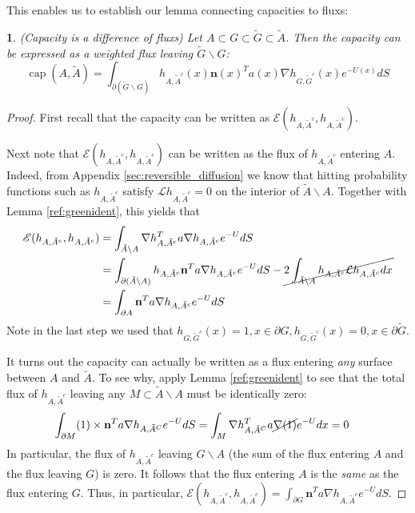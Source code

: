 \documentclass[english, aip, jcp, priprint, graphicx,floatfix]{revtex4-1}
\theoremstyle{plain}
\newtheorem*{lem*}{\protect\lemmaname}
\theoremstyle{definition}
\theoremstyle{plain}
\providecommand{\lemmaname}{Lemma}
\begin{document}
This enables us to establish our lemma connecting capacities to fluxs:

\begin{lem*}(Capacity is a difference of fluxs)  Let $A\subset G \subset \tilde G \subset \tilde A$.  Then the capacity can be expressed as a weighted flux leaving $\tilde G \backslash G$:
\[
\ensuremath{\operatorname{cap}} (A, \tilde{A}) = \int_{\partial (\tilde G \backslash G)}  h_{A, \tilde{A}^c} (x)   \textbf{n}(x)^T a (x) \nabla h_{G, \tilde{G}^c} (x)e^{- U (x)} dS
\]
\end{lem*}
\begin{proof}
First recall that the capacity can be written as $\mathscr{E}(h_{A,\tilde A^c},h_{A,\tilde A^c})$.

Next note that $\mathscr{E}(h_{A,\tilde A^c},h_{A,\tilde A^c}) $ can be written as the flux of $h_{A,\tilde A^c}$ entering $A$.  Indeed, from Appendix \ref{sec:reversible_diffusion} we know that hitting probability functions such as $h_{A,\tilde A^c}$ satisfy $\mathcal Lh_{A,\tilde A^c}=0$ on the interior of $\tilde A \backslash A$.  Together with Lemma \ref{ref:greenident}, this yields that 
\begin{align*}
\mathscr{E}(h_{A,\tilde A^c},h_{A,\tilde A^c}) 
    &= \int_{\tilde A \backslash A}  \nabla h_{A, \tilde{A}^c}^T a  \nabla h_{A, \tilde{A}^c} e^{- U } dS \\
    &= \int_{\partial (\tilde A \backslash A)}  h_{A, \tilde{A}^c} \textbf{n}^T a  \nabla h_{A, \tilde{A}^c} e^{- U } dS - \cancel{2\int_{\tilde A \backslash A} h_{A,\tilde A^c}\mathcal{L}h_{A,\tilde A^c} dx}\\
    &= \int_{\partial A}  \textbf{n}^T a  \nabla h_{A, \tilde{A}^c} e^{- U } dS
\end{align*}
Note in the last step we used that $h_{G,\tilde G^c}(x)=1,x\in \partial G,h_{G,\tilde G^c}(x)=0,x\in \partial \tilde G$.  

It turns out the capacity can actually be written as a flux entering \emph{any} surface between $A$ and $\tilde A$.  To see why, apply Lemma \ref{ref:greenident} to see that the total flux of $h_{A,\tilde A^c}$ leaving any $M\subset \tilde A \backslash A$ must be identically zero:
\begin{align*}
\int_{\partial M} (1) \times \textbf{n}^T a  \nabla h_{A,\tilde A^C} e^{- U } dS
    &= \int_{M} \nabla h_{A,\tilde A^C}^T  a  \cancel{\nabla (1)} e^{- U } dx=0
\end{align*}
In particular, the flux of $h_{A,\tilde A^c}$ leaving $G \backslash A$ (the sum of the flux entering $A$ and the flux leaving $G$) is zero.  It follows that the flux entering $A$ is the \emph{same} as the flux entering $G$.  Thus, in particular, $\mathscr{E}(h_{A,\tilde A^c},h_{A,\tilde A^c}) = \int_{\partial G}  \textbf{n}^T a  \nabla h_{A, \tilde{A}^c} e^{- U } dS$.  


\end{proof}
\end{document}
